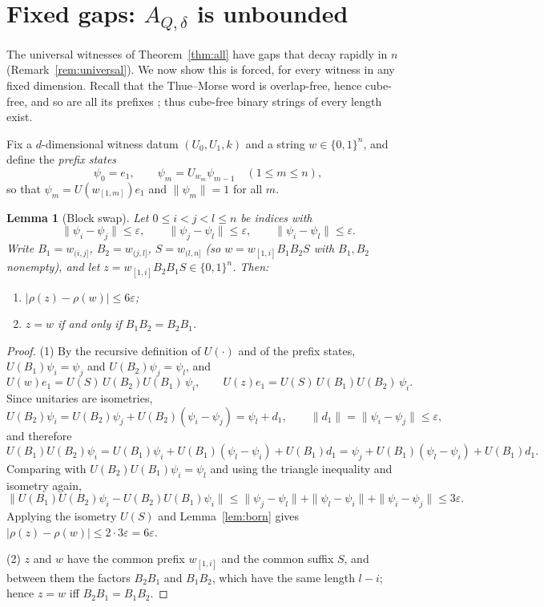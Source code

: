 \documentclass[11pt]{amsart}
\newtheorem{lemma}[theorem]{Lemma}
\theoremstyle{definition}
\theoremstyle{remark}
\begin{document}
\section{Fixed gaps: \texorpdfstring{$A_{Q,\delta}$}{A(Q,delta)} is
unbounded}\label{sec:delta}

The universal witnesses of Theorem~\ref{thm:all} have gaps that
decay rapidly in $n$ (Remark~\ref{rem:universal}). We now show this
is forced, for every witness in any fixed dimension. Recall that the Thue--Morse word is
overlap-free, hence cube-free, and so are all its prefixes
\cite[Ch.~1]{AS03}; thus cube-free binary strings of every length
exist.

Fix a $d$-dimensional witness datum $(U_0,U_1,k)$ and a string
$w\in\{0,1\}^n$, and define the \emph{prefix states}
\[
  \psi_0=e_1,\qquad \psi_m=U_{w_m}\psi_{m-1}
  \quad(1\le m\le n),
\]
so that $\psi_m=U(w_{[1,m]})e_1$ and $\|\psi_m\|=1$ for all $m$.

\begin{lemma}[Block swap]\label{lem:qswap}
Let $0\le i<j<l\le n$ be indices with
\[
  \|\psi_i-\psi_j\|\le\varepsilon,\qquad
  \|\psi_j-\psi_l\|\le\varepsilon,\qquad
  \|\psi_i-\psi_l\|\le\varepsilon .
\]
Write $B_1=w_{(i,j]}$, $B_2=w_{(j,l]}$, $S=w_{(l,n]}$ (so
$w=w_{[1,i]}B_1B_2S$ with $B_1,B_2$ nonempty), and let
$z=w_{[1,i]}B_2B_1S\in\{0,1\}^n$. Then:
\begin{enumerate}
\item $|\rho(z)-\rho(w)|\le6\varepsilon$;
\item $z=w$ if and only if $B_1B_2=B_2B_1$.
\end{enumerate}
\end{lemma}

\begin{proof}
(1) By the recursive definition of $U(\cdot)$ and of the prefix
states, $U(B_1)\psi_i=\psi_j$ and $U(B_2)\psi_j=\psi_l$, and
\[
  U(w)e_1=U(S)\,U(B_2)U(B_1)\,\psi_i,
  \qquad
  U(z)e_1=U(S)\,U(B_1)U(B_2)\,\psi_i .
\]
Since unitaries are isometries,
\[
  U(B_2)\psi_i=U(B_2)\psi_j+U(B_2)(\psi_i-\psi_j)
  =\psi_l+d_1,\qquad
  \|d_1\|=\|\psi_i-\psi_j\|\le\varepsilon,
\]
and therefore
\[
  U(B_1)U(B_2)\psi_i
  =U(B_1)\psi_i+U(B_1)(\psi_l-\psi_i)+U(B_1)d_1
  =\psi_j+U(B_1)(\psi_l-\psi_i)+U(B_1)d_1 .
\]
Comparing with $U(B_2)U(B_1)\psi_i=\psi_l$ and using the triangle
inequality and isometry again,
\[
  \bigl\|U(B_1)U(B_2)\psi_i-U(B_2)U(B_1)\psi_i\bigr\|
  \le\|\psi_j-\psi_l\|+\|\psi_l-\psi_i\|+\|\psi_i-\psi_j\|
  \le3\varepsilon .
\]
Applying the isometry $U(S)$ and Lemma~\ref{lem:born} gives
$|\rho(z)-\rho(w)|\le2\cdot3\varepsilon=6\varepsilon$.

(2) $z$ and $w$ have the common prefix $w_{[1,i]}$ and the common
suffix $S$, and between them the factors $B_2B_1$ and $B_1B_2$, which
have the same length $l-i$; hence $z=w$ iff $B_2B_1=B_1B_2$.
\end{proof}
\end{document}
